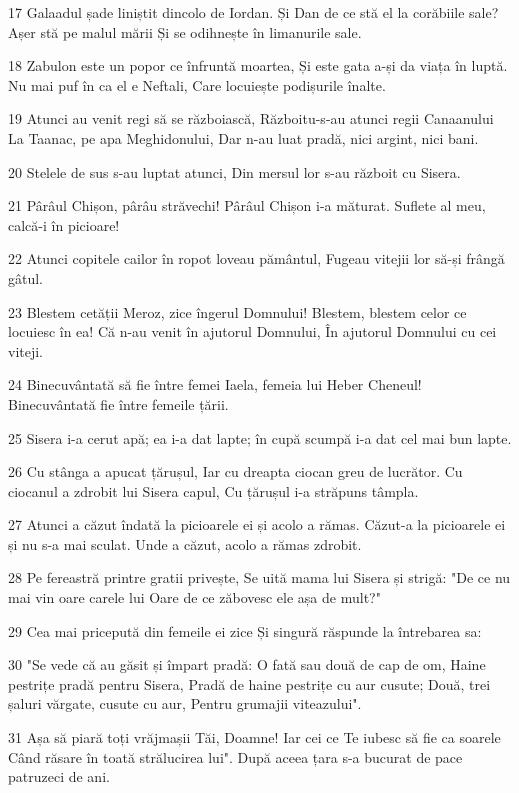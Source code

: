 \par 17 Galaadul șade liniștit dincolo de Iordan. Și Dan de ce stă el la corăbiile sale? Așer stă pe malul mării Și se odihnește în limanurile sale.
\par 18 Zabulon este un popor ce înfruntă moartea, Și este gata a-și da viața în luptă. Nu mai puf în ca el e Neftali, Care locuiește podișurile înalte.
\par 19 Atunci au venit regi să se războiască, Războitu-s-au atunci regii Canaanului La Taanac, pe apa Meghidonului, Dar n-au luat pradă, nici argint, nici bani.
\par 20 Stelele de sus s-au luptat atunci, Din mersul lor s-au războit cu Sisera.
\par 21 Pârâul Chișon, pârâu străvechi! Pârâul Chișon i-a măturat. Suflete al meu, calcă-i în picioare!
\par 22 Atunci copitele cailor în ropot loveau pământul, Fugeau vitejii lor să-și frângă gâtul.
\par 23 Blestem cetății Meroz, zice îngerul Domnului! Blestem, blestem celor ce locuiesc în ea! Că n-au venit în ajutorul Domnului, În ajutorul Domnului cu cei viteji.
\par 24 Binecuvântată să fie între femei Iaela, femeia lui Heber Cheneul! Binecuvântată fie între femeile țării.
\par 25 Sisera i-a cerut apă; ea i-a dat lapte; în cupă scumpă i-a dat cel mai bun lapte.
\par 26 Cu stânga a apucat țărușul, Iar cu dreapta ciocan greu de lucrător. Cu ciocanul a zdrobit lui Sisera capul, Cu țărușul i-a străpuns tâmpla.
\par 27 Atunci a căzut îndată la picioarele ei și acolo a rămas. Căzut-a la picioarele ei și nu s-a mai sculat. Unde a căzut, acolo a rămas zdrobit.
\par 28 Pe fereastră printre gratii privește, Se uită mama lui Sisera și strigă: "De ce nu mai vin oare carele lui Oare de ce zăbovesc ele așa de mult?"
\par 29 Cea mai pricepută din femeile ei zice Și singură răspunde la întrebarea sa:
\par 30 "Se vede că au găsit și împart pradă: O fată sau două de cap de om, Haine pestrițe pradă pentru Sisera, Pradă de haine pestrițe cu aur cusute; Două, trei șaluri vărgate, cusute cu aur, Pentru grumajii viteazului".
\par 31 Așa să piară toți vrăjmașii Tăi, Doamne! Iar cei ce Te iubesc să fie ca soarele Când răsare în toată strălucirea lui". După aceea țara s-a bucurat de pace patruzeci de ani.


